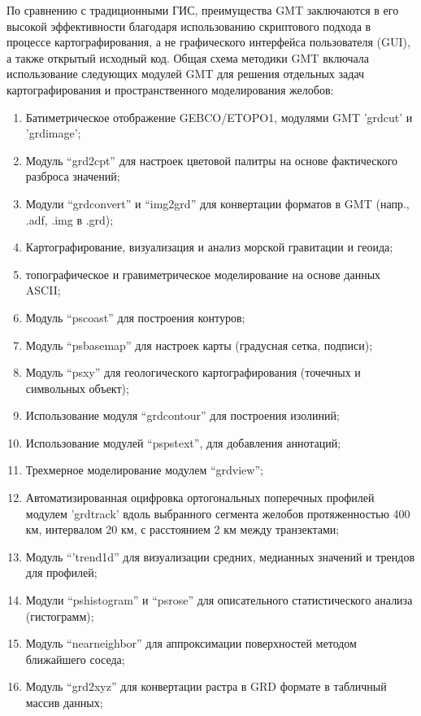По сравнению с традиционными ГИС, преимущества GMT заключаются в его высокой эффективности благодаря использованию скриптового подхода в процессе картографирования, а не графического интерфейса пользователя (GUI), а также открытый исходный код. Общая схема методики GMT включала использование следующих модулей GMT для решения отдельных задач картографирования и пространственного моделирования желобов: 
\begin{enumerate}
	\item Батиметрическое отображение GEBCO/ETOPO1, модулями GMT 'grdcut' и 'grdimage'; 
	\item Модуль “grd2cpt” для настроек цветовой палитры на основе фактического разброса значений;
	\item Модули “grdconvert” и “img2grd” для конвертации форматов в GMT (напр., .adf, .img в .grd);
	\item Картографирование, визуализация и анализ морской гравитации и геоида; 
	\item топографическое и гравиметрическое моделирование на основе данных ASCII; 
	\item Модуль “pscoast” для построения контуров;
	\item Модуль “psbasemap” для настроек карты (градусная сетка, подписи);
	\item Модуль “psxy” для геологического картографирования (точечных и символьных объект);
	\item Использование модуля  “grdcontour” для построения изолиний;
	\item Использование модулей “pspstext”, для добавления аннотаций; 
	\item Трехмерное моделирование модулем “grdview”;
	\item Автоматизированная оцифровка ортогональных поперечных профилей модулем ’grdtrack’ вдоль выбранного сегмента желобов протяженностью 400 км, интервалом 20 км, с расстоянием 2 км между транзектами; 
	\item Модуль “'trend1d” для визуализации средних, медианных значений и трендов для профилей;
	\item Модули “pshistogram” и “psrose” для описательного статистического анализа (гистограмм);
	\item Модуль “nearneighbor” для аппроксимации поверхностей методом ближайшего соседа;
	\item Модуль “grd2xyz” для конвертации растра в GRD формате в табличный массив данных;
\end{enumerate}

